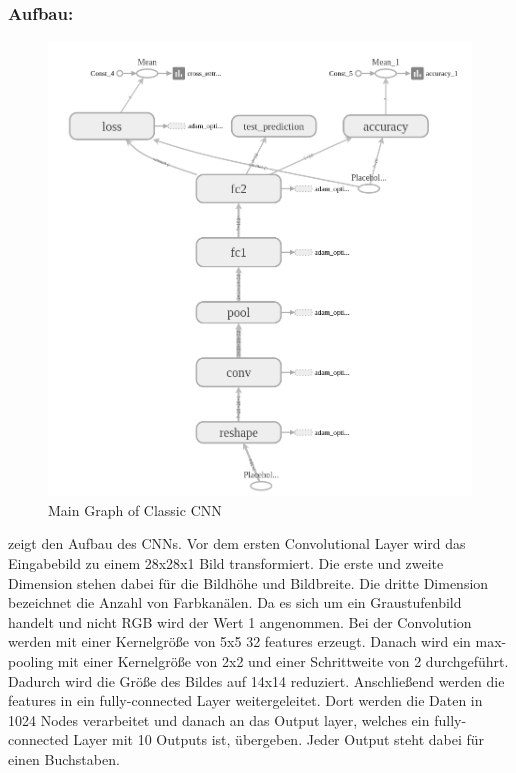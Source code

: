 \documentclass[runningheads,a4paper]{llncs}[2015/06/24]
\begin{document}
\subsubsection*{Aufbau:}
\begin{figure}
	\includegraphics[width=\textwidth]{images/main_graph_conv.png}
	\caption{Main Graph of Classic CNN}
	\label{fig:main_graph_conv}
\end{figure}
 zeigt den Aufbau des CNNs. Vor dem ersten Convolutional Layer wird das Eingabebild zu einem 28x28x1 Bild transformiert. Die erste und zweite Dimension stehen dabei für die Bildhöhe und Bildbreite. Die dritte Dimension bezeichnet die Anzahl von Farbkanälen. Da es sich um ein Graustufenbild handelt und nicht RGB wird der Wert 1 angenommen. 
Bei der Convolution werden mit einer Kernelgröße von 5x5 32 features erzeugt. Danach wird ein max-pooling mit einer Kernelgröße von 2x2 und einer Schrittweite von 2 durchgeführt. Dadurch wird die Größe des Bildes auf 14x14 reduziert. Anschließend werden die features in ein fully-connected Layer weitergeleitet. Dort werden die Daten in 1024 Nodes verarbeitet und danach an das Output layer, welches ein fully-connected Layer mit 10 Outputs ist, übergeben. Jeder Output steht dabei für einen Buchstaben.
\end{document}

